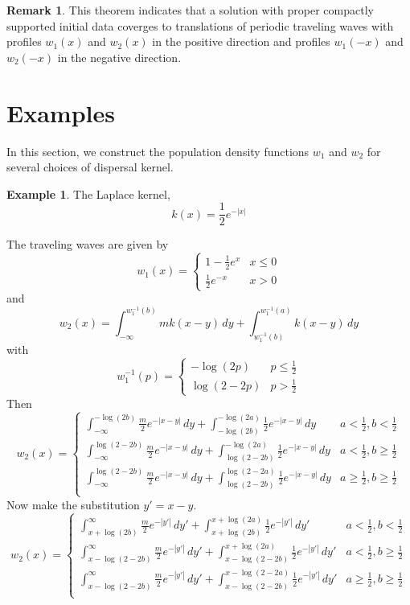 \documentclass[11pt]{article}
\theoremstyle{definition}
\newtheorem{rem}[thm]{Remark}
\newtheorem{ex}[thm]{Example}
\numberwithin{equation}{section}
\numberwithin{thm}{section}
\newcommand{\winva}{{w_1^{-1}(a)}}
\newcommand{\winvb}{{w_1^{-1}(b)}}
\begin{document}
\begin{rem}
This theorem indicates that a solution with proper compactly supported initial data coverges to translations of periodic traveling waves with profiles $w_1(x)$ and $w_2(x)$ in the positive direction and profiles $w_1(-x)$ and $w_2(-x)$ in the negative direction.
\end{rem}

\section{Examples}

In this section, we construct the population density functions $w_1$ and $w_2$ for several choices of dispersal kernel.

\begin{ex}
The Laplace kernel,
\begin{equation}
k(x) = \frac{1}{2} e^{-|x|}
\end{equation}

The traveling waves are given by
\begin{equation}
w_1(x) =   \begin{cases} 
1 - \frac{1}{2}e^{x} & x \leq 0 \\
\frac{1}{2}e^{-x} & x > 0
\end{cases}
\end{equation}
and
\begin{equation}
w_2(x) = \int_{-\infty}^\winvb mk(x-y)\,dy + \int_{\winvb}^\winva k(x-y)\,dy
\end{equation}
with
$$ w_1^{-1}(p) = \begin{cases} -\log(2p) & p\leq \frac{1}{2} \\ \log(2-2p) & p > \frac{1}{2} \end{cases} $$
Then
$$ w_2(x) = \begin{cases}
\int_{-\infty}^{-\log(2b)} \frac{m}{2}e^{-|x-y|}\,dy + \int_{-\log(2b)}^{-\log(2a)} \frac{1}{2}e^{-|x-y|} \,dy & a<\frac{1}{2}, b < \frac{1}{2} \\
\int_{-\infty}^{\log(2-2b)} \frac{m}{2}e^{-|x-y|} \,dy + \int_{\log(2-2b)}^{-\log(2a)} \frac{1}{2}e^{-|x-y|} \,dy & a<\frac{1}{2}, b \geq \frac{1}{2} \\ 
\int_{-\infty}^{\log(2-2b)} \frac{m}{2}e^{-|x-y|} \,dy + \int_{\log(2-2b)}^{\log(2-2a)} \frac{1}{2}e^{-|x-y|} \,dy & a\geq\frac{1}{2}, b \geq \frac{1}{2} \\
\end{cases} $$
Now make the substitution $y'=x-y$.
$$ w_2(x) = \begin{cases}
\int_{x+\log(2b)}^{\infty} \frac{m}{2}e^{-|y'|}\,dy' + \int_{x+\log(2b)}^{x+\log(2a)} \frac{1}{2}e^{-|y'|} \,dy' & a<\frac{1}{2}, b < \frac{1}{2} \\
\int_{x-\log(2-2b)}^{\infty} \frac{m}{2}e^{-|y'|} \,dy' + \int_{x-\log(2-2b)}^{x+\log(2a)} \frac{1}{2}e^{-|y'|} \,dy' & a<\frac{1}{2}, b \geq \frac{1}{2} \\ 
\int_{x-\log(2-2b)}^{\infty} \frac{m}{2}e^{-|y'|} \,dy' + \int_{x-\log(2-2b)}^{x-\log(2-2a)} \frac{1}{2}e^{-|y'|} \,dy' & a\geq\frac{1}{2}, b \geq \frac{1}{2} \\
\end{cases} $$


\end{ex}
\end{document}
